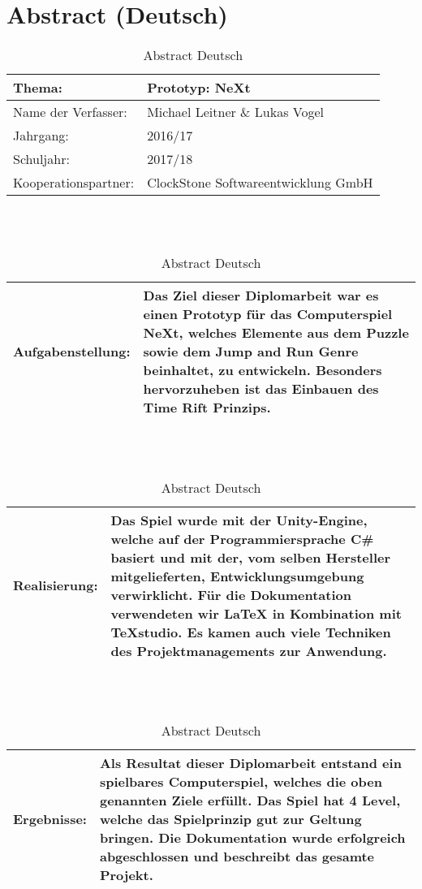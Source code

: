 \chapter*{Abstract (Deutsch)}
\def \currentAuthor {Lukas Vogel}
\begin{table}[H]
	
	\renewcommand{\arraystretch}{1.5}
\begin{tabular}{|p{4cm}|p{10cm}|}
	\hline 
	Thema: &  Prototyp: NeXt\\ 
	\hline
	 Name der Verfasser: & Michael Leitner \& Lukas Vogel  \\ 
	\hline 
	Jahrgang: & 2016/17 \\
	\hline
	 Schuljahr: & 2017/18 \\
	\hline 
	Kooperationspartner: & ClockStone Softwareentwicklung GmbH\\
	\hline
\end{tabular}
\ \\
\ \\
\begin{tabular}{|p{4cm}|p{10cm}|}
	\hline
	Aufgabenstellung: & Das Ziel dieser Diplomarbeit war es einen Prototyp für das Computerspiel NeXt, welches Elemente aus dem Puzzle sowie dem Jump and Run Genre beinhaltet, zu entwickeln. Besonders hervorzuheben ist das Einbauen des Time Rift Prinzips. \\
	\hline
\end{tabular} 
\ \\
\ \\
\begin{tabular}{|p{4cm}|p{10cm}|}
	\hline
	Realisierung: & Das Spiel wurde mit der Unity-Engine, welche auf der Programmiersprache C\# basiert und mit der, vom selben Hersteller mitgelieferten, Entwicklungsumgebung verwirklicht. Für die Dokumentation verwendeten wir LaTeX in Kombination mit TeXstudio. Es kamen auch viele Techniken des Projektmanagements zur Anwendung.\\
	\hline
\end{tabular}
\ \\
\ \\
\begin{tabular}{|p{4cm}|p{10cm}|}
	\hline
	Ergebnisse: & Als Resultat dieser Diplomarbeit entstand ein spielbares Computerspiel, welches die oben genannten Ziele erfüllt. Das Spiel hat 4 Level, welche das Spielprinzip gut zur Geltung bringen. Die Dokumentation wurde erfolgreich abgeschlossen und beschreibt das gesamte Projekt. \\
	\hline
\end{tabular}
\caption{Abstract Deutsch}
\end{table}
